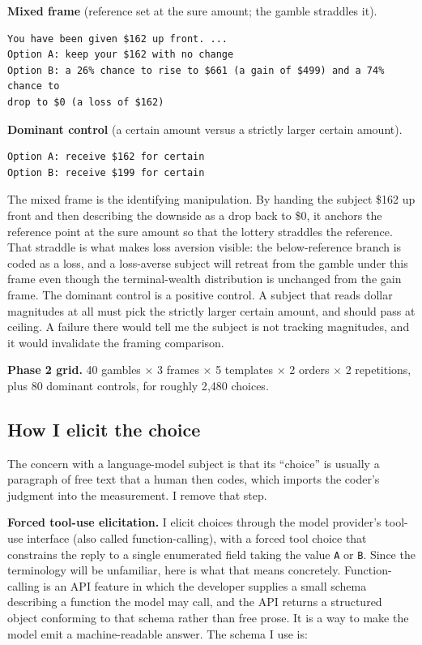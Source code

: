\documentclass[11pt]{article}
\begin{document}
\textbf{Mixed frame} (reference set at the sure amount; the gamble straddles it).
\begin{lstlisting}[style=prompt]
You have been given $162 up front. ...
Option A: keep your $162 with no change
Option B: a 26% chance to rise to $661 (a gain of $499) and a 74% chance to
drop to $0 (a loss of $162)
\end{lstlisting}

\textbf{Dominant control} (a certain amount versus a strictly larger certain amount).
\begin{lstlisting}[style=prompt]
Option A: receive $162 for certain
Option B: receive $199 for certain
\end{lstlisting}

The mixed frame is the identifying manipulation. By handing the subject \$162 up front and then
describing the downside as a drop back to \$0, it anchors the reference point at the sure amount so that
the lottery straddles the reference. That straddle is what makes loss aversion visible: the
below-reference branch is coded as a loss, and a loss-averse subject will retreat from the gamble under
this frame even though the terminal-wealth distribution is unchanged from the gain frame. The dominant
control is a positive control. A subject that reads dollar magnitudes at all must pick the strictly
larger certain amount, and should pass at ceiling. A failure there would tell me the subject is not
tracking magnitudes, and it would invalidate the framing comparison.

\textbf{Phase 2 grid.} 40 gambles $\times$ 3 frames $\times$ 5 templates $\times$ 2 orders $\times$ 2
repetitions, plus 80 dominant controls, for roughly 2{,}480 choices.

\subsection{How I elicit the choice}

The concern with a language-model subject is that its ``choice'' is usually
a paragraph of free text that a human then codes, which imports the coder's judgment into the measurement.
I remove that step.

\textbf{Forced tool-use elicitation.} I elicit choices through the model provider's tool-use interface
(also called function-calling), with a forced tool choice that constrains the reply to a single enumerated
field taking the value \texttt{A} or \texttt{B}. Since the terminology will be unfamiliar, here is what
that means concretely. Function-calling is an API feature in which the developer supplies a small schema
describing a function the model may call, and the API returns a structured object conforming to that
schema rather than free prose. It is a way to make the model emit a machine-readable answer. The schema I
use is:
\end{document}
